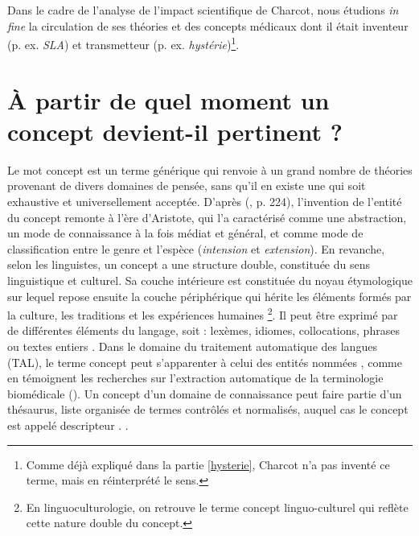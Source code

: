 Dans le cadre de l'analyse de l'impact scientifique de Charcot, nous étudions \textit{in fine} la circulation de ses théories et des concepts médicaux dont il était inventeur (p. ex. \textit{SLA}) et transmetteur (p. ex. \textit{hystérie})\footnote{Comme déjà expliqué dans la partie \ref{hysterie}, Charcot n'a pas inventé ce terme, mais en réinterprété le sens.}. 

\section{À partir de quel moment un concept devient-il pertinent ?}
\label{concept}

Le mot \og{}concept\fg{} est un terme générique qui renvoie à un grand nombre de théories provenant de divers domaines de pensée, sans qu'il en existe une qui soit exhaustive et universellement acceptée. D'après \citeauthor{Lecourt1999} (\citeyear{Lecourt1999}, p. 224), l'invention de l'entité du concept remonte à l'ère d'Aristote, qui l'a caractérisé comme une abstraction, un mode de connaissance à la fois médiat et général, et comme mode de classification entre le genre et l'espèce (\textit{intension} et \textit{extension}). En revanche, selon les linguistes, un concept a une structure double, constituée du sens linguistique et culturel.
Sa couche intérieure est constituée du noyau étymologique sur lequel repose ensuite la couche périphérique qui hérite les éléments formés par la culture, les traditions et les expériences humaines
\footnote{En linguoculturologie, on retrouve le terme \og{}concept linguo-culturel\fg{} qui reflète cette nature double du concept.}. Il peut être exprimé par de différentes éléments du langage, soit : lexèmes, idiomes, collocations, phrases ou textes entiers \citep[p.~5]{nemickiene2011concept}. Dans le domaine du traitement automatique des langues (\textsc{TAL}), le terme \og concept \fg{} peut s'apparenter à celui des \og entités nommées \fg{}, comme en témoignent les recherches sur l'extraction automatique de la terminologie biomédicale (\citealp{jolly2024exploring,navarro2023clinical}). Un concept d'un domaine de connaissance peut faire partie d'un thésaurus, liste organisée de termes contrôlés et normalisés, auquel cas le concept est appelé \og descripteur \fg{}. \citep[p.~16]{RENNESSON202015}.



